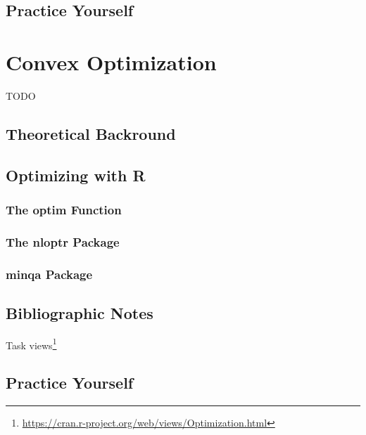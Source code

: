 \documentclass[]{book}
\renewcommand{\href}[2]{#2\footnote{\url{#1}}}
\theoremstyle{definition}
\theoremstyle{definition}
\theoremstyle{definition}
\theoremstyle{remark}
\begin{document}
\hypertarget{practice-yourself-13}{%
\section{Practice Yourself}\label{practice-yourself-13}}

\hypertarget{convex}{%
\chapter{Convex Optimization}\label{convex}}

TODO

\hypertarget{theoretical-backround}{%
\section{Theoretical Backround}\label{theoretical-backround}}

\hypertarget{optimizing-with-r}{%
\section{Optimizing with R}\label{optimizing-with-r}}

\hypertarget{the-optim-function}{%
\subsection{The optim Function}\label{the-optim-function}}

\hypertarget{the-nloptr-package}{%
\subsection{The nloptr Package}\label{the-nloptr-package}}

\hypertarget{minqa-package}{%
\subsection{minqa Package}\label{minqa-package}}

\hypertarget{bibliographic-notes-16}{%
\section{Bibliographic Notes}\label{bibliographic-notes-16}}

\href{https://cran.r-project.org/web/views/Optimization.html}{Task views}

\hypertarget{practice-yourself-14}{%
\section{Practice Yourself}\label{practice-yourself-14}}
\end{document}

